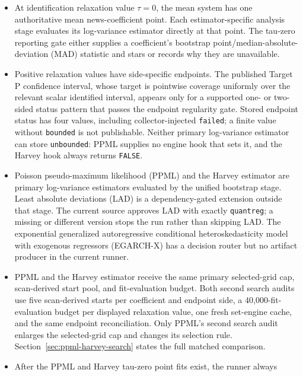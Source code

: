 \documentclass[11pt]{article}
\DeclareRobustCommand{\code}[1]{%
  \ifmmode\text{\ttfamily\detokenize{#1}}\else\nolinkurl{#1}\fi}
\begin{document}
\begin{itemize}
    volatility-sensitivity
    resample-index family uses block length $2\ell$.
    Diagnostic mean specification A reuses the primary resample-index family in
    the paired B-versus-A mean-specification comparison.
  \item At identification relaxation value $\tau=0$, the mean system has one
    authoritative mean news-coefficient point. Each estimator-specific analysis
    stage evaluates its log-variance estimator directly at that point. The
    tau-zero reporting gate either supplies a coefficient's bootstrap
    point/median-absolute-deviation (MAD) statistic and stars or records why
    they are unavailable.
  \item Positive relaxation values have side-specific endpoints. The published
    Target P confidence interval, whose target is pointwise coverage uniformly
    over the relevant scalar identified interval, appears only for a supported
    one- or two-sided status pattern that passes the endpoint regularity gate.
    Stored endpoint status has four values, including collector-injected
    \code{failed}; a finite value without \code{bounded} is not publishable.
    Neither primary log-variance estimator can store \code{unbounded}: PPML
    supplies no engine hook that sets it, and the Harvey hook always returns
    \code{FALSE}.
  \item Poisson pseudo-maximum likelihood (PPML) and the Harvey estimator are
    primary log-variance estimators evaluated by the unified bootstrap stage.
    Least absolute deviations (LAD) is a dependency-gated extension outside that
    stage. The current source approves LAD with exactly \code{quantreg} 6.1; a
    missing or different version stops the run rather than skipping LAD.
    The exponential generalized autoregressive conditional
    heteroskedasticity model with exogenous regressors (EGARCH-X) has a decision
    router but no artifact producer in the current runner.
  \item PPML and the Harvey estimator receive the same primary selected-grid
    cap, scan-derived start pool, and fit-evaluation budget. Both second search
    audits use five scan-derived starts per coefficient and endpoint side, a
    40,000-fit-evaluation budget per displayed relaxation value, one fresh
    set-engine cache, and the same endpoint reconciliation. Only PPML's second
    search audit enlarges the selected-grid cap and changes its selection rule.
    Section~\ref{sec:ppml-harvey-search}
    states the full matched comparison.
  \item After the PPML and Harvey tau-zero point fits exist, the runner always

\end{itemize}
\end{document}
